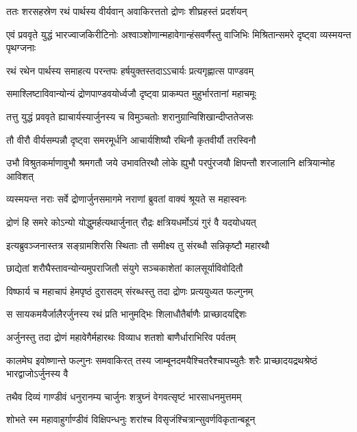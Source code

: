 \twolineshloka
{ततः शरसहस्रेण रथं पार्थस्य वीर्यवान्}
{अवाकिरत्ततो द्रोणः शीघ्रहस्तं प्रदर्शयन्}


\onelineshloka
{एवं प्रववृते युद्धं भारज्वाजकिरीटिनोः}
\twolineshloka
{अश्वाञ्शोणान्महावेगान्हंसवर्णैस्तु वाजिभिः}
{मिश्रितान्समरे दृष्ट्वा व्यस्मयन्त पृथग्जनाः}


\twolineshloka
{रथं रथेन पार्थस्य समाहत्य परन्तपः}
{हर्षयुक्तस्तदाऽऽचार्यः प्रत्यगृह्णात्स पाण्डवम्}


\twolineshloka
{समाश्लिष्टाविवान्योन्यं द्रोणपाण्डवयोर्ध्वजौ}
{दृष्ट्वा प्राकम्पत मुहुर्भारतानां महाचमूः}


\twolineshloka
{तत्तु युद्धं प्रववृते ह्याचार्यस्यार्जुनस्य च}
{विमुञ्चतोः शरानुग्रान्विशिखान्दीप्ततेजसः}


\twolineshloka
{तौ वीरौ वीर्यसम्पन्नौ दृष्ट्वा समरमूर्धनि}
{आचार्यशिष्यौ रथिनौ कृतवीर्यौ तरस्विनौ}


\threelineshloka
{उभौ विश्रुतकर्माणावुभौ श्रमगतौ जये}
{उभावतिरथौ लोके ह्युभौ परपुंरजयौ}
{क्षिपन्तौ शरजालानि क्षत्रियान्मोह आविशत्}


\twolineshloka
{व्यस्मयन्त नराः सर्वे द्रोणार्जुनसमागमे}
{नराणां ब्रुवतां वाक्यं श्रूयते स महास्वनः}


\twolineshloka
{द्रोणं हि समरे कोऽन्यो योद्धुमर्हत्यथार्जुनात्}
{रौद्रः क्षत्रियधर्मोऽयं गुरं वै यदयोधयत्}


\twolineshloka
{इत्यब्रुवञ्जनास्तत्र सङ्ग्रामशिरसि स्थिताः}
{तौ समीक्ष्य तु संरब्धौ सन्निकृष्टौ महारथौ}


\twolineshloka
{छाद्येतां शरौघैस्तावन्योन्यमुपराजितौ}
{संयुगे सञ्चकाशेतां कालसूर्याविवोदितौ}


\twolineshloka
{विष्फार्य च महाचापं हेमपृष्ठं दुरासदम्}
{संरब्धस्तु तदा द्रोणः प्रत्ययुध्यत फल्गुनम्}


\twolineshloka
{स सायकमयैर्जालैरर्जुनस्य रथं प्रति}
{भानुमद्भिः शिलाधौतैर्बाणैः प्राच्छादयद्दिशः}


\twolineshloka
{अर्जुनस्तु तदा द्रोणं महावेगैर्महारथः}
{विव्याध शतशो बाणैर्धाराभिरिव पर्वतम्}


\onelineshloka
{कालमेघ इवोष्णान्ते फल्गुनः समवाकिरत्}
\twolineshloka
{तस्य जाम्बूनदमयैश्चितरैश्चापच्युतैः शरैः}
{प्राच्छादयद्रथश्रेष्ठं भारद्वाजोऽर्जुनस्य वै}


\twolineshloka
{तथैव दिव्यं गाण्डीवं धनुरानम्य चार्जुनः}
{शत्रुघ्नं वेगवत्सृष्टं भारसाधनमुत्तमम्}


\twolineshloka
{शोभते स्म महावाहुर्गाण्डीवं विक्षिपन्धनुः}
{शरांश्च विसृजंश्चित्रान्सुवर्णविकृतान्बहून्}


